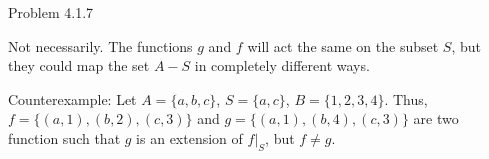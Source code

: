 \documentclass{article}
\theoremstyle{definition}
\begin{document}
	\vspace{1cm}



	\noindent Problem 4.1.7  \vspace{0.3cm}

	Not necessarily. The functions $g$ and $f$ will act the same on the
	subset $S$, but they could map the set $A-S$ in completely different
	ways.

	Counterexample: Let $A=\{a, b, c\}$, $S=\{a,c\}$, $B=\{1,2,3,4\}$.
	Thus, $f=\{(a,1), (b,2), (c,3)\}$ and $g=\{(a,1),(b,4),(c,3)\}$ are
	two function such that $g$ is an extension of $f|_S$, but $f\not=g$.

	\vspace{1cm}

\end{document}
